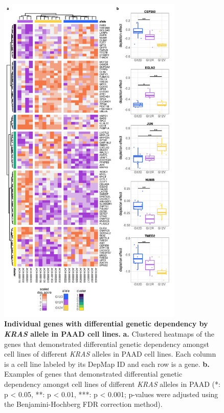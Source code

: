 \documentclass[english, 10pt, letterpaper]{article}
\newcommand{\KRAS}{\emph{KRAS}}
\begin{document}
\begin{figure}[h!]
\centering
\includegraphics[width=88mm]{figures/Supp_Fig_8.jpeg}
\caption{
    \textbf{Individual genes with differential genetic dependency by \KRAS{} allele in PAAD cell lines.}
    \textbf{a.} Clustered heatmaps of the genes that demonstrated differential genetic dependency amongst cell lines of different \KRAS{} alleles in PAAD cell lines. Each column is a cell line labeled by its DepMap ID and each row is a gene.
    \textbf{b.} Examples of genes that demonstrated differential genetic dependency amongst cell lines of different \KRAS{} alleles in PAAD (*: p < 0.05, **: p < 0.01, ***: p < 0.001; p-values were adjusted using the Benjamini-Hochberg FDR correction method).
}
\label{sfig:paad-dependency-heatmap}
\end{figure}
\newpage
\end{document}
